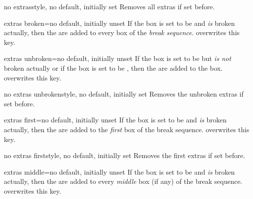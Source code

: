 \begin{docTcbKey}[][doc new=2015-07-16]{no extras}{}{style, no default, initially set}
  Removes all extras if set before.
\end{docTcbKey}


\begin{docTcbKey}[][doc new=2015-07-16]{extras broken}{=}{no default, initially unset}
  If the box is set to be  and \emph{is} broken actually,
  then the  are added to every box of the \emph{break sequence}.
   overwrites this key.
\end{docTcbKey}

\begin{docTcbKey}[][doc new=2015-07-16]{extras unbroken}{=}{no default, initially unset}
  If the box is set to be  but \emph{is not} broken actually
  or if the box is set to be ,
  then the  are added to the box.
   overwrites this key.
\end{docTcbKey}

\begin{docTcbKey}[][doc new=2015-07-16]{no extras unbroken}{}{style, no default, initially set}
  Removes the unbroken extras if set before.
\end{docTcbKey}

\begin{docTcbKey}[][doc new=2015-07-16]{extras first}{=}{no default, initially unset}
  If the box is set to be  and \emph{is} broken actually,
  then the  are added to the \emph{first} box of the break sequence.
   overwrites this key.
\end{docTcbKey}

\begin{docTcbKey}[][doc new=2015-07-16]{no extras first}{}{style, no default, initially set}
  Removes the first extras if set before.
\end{docTcbKey}

\begin{docTcbKey}[][doc new=2015-07-16]{extras middle}{=}{no default, initially unset}
  If the box is set to be  and \emph{is} broken actually,
  then the  are added to every \emph{middle} box (if any) of the break sequence.
   overwrites this key.
\end{docTcbKey}

